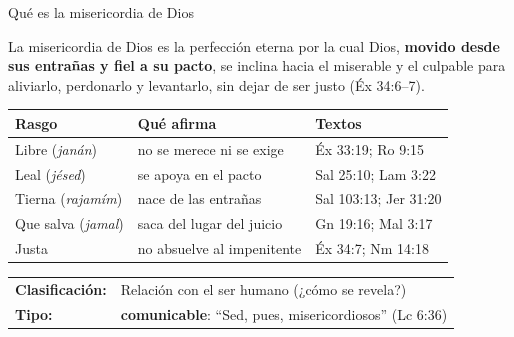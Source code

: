 \documentclass[hyperref={bookmarks=false},aspectratio=169]{beamer}
\newcommand{\destacar}[1]{\textbf{\textcolor{azul}{#1}}}
\begin{document}
\begin{frame}{Qué es la misericordia de Dios}
\begin{tcolorbox}[colback=papiro,colframe=azul,boxrule=1pt,arc=3pt,fonttitle=\bfseries\small,title=Definición]
\small La misericordia de Dios es la perfección eterna por la cual Dios, \destacar{movido desde sus entrañas y fiel a su pacto}, se inclina hacia el miserable y el culpable para aliviarlo, perdonarlo y levantarlo, sin dejar de ser justo (Éx 34:6--7).
\end{tcolorbox}
\scriptsize\renewcommand{\arraystretch}{1.2}
\begin{tabular}{@{}>{\RaggedRight\arraybackslash}p{2.4cm}>{\RaggedRight\arraybackslash}p{5.6cm}>{\RaggedRight\arraybackslash}p{3.6cm}@{}}
\toprule
\textbf{Rasgo} & \textbf{Qué afirma} & \textbf{Textos} \\ \midrule
Libre (\emph{janán}) & no se merece ni se exige & Éx 33:19; Ro 9:15 \\
Leal (\emph{jésed}) & se apoya en el pacto & Sal 25:10; Lam 3:22 \\
Tierna (\emph{rajamím}) & nace de las entrañas & Sal 103:13; Jer 31:20 \\
Que salva (\emph{jamal}) & saca del lugar del juicio & Gn 19:16; Mal 3:17 \\
Justa & no absuelve al impenitente & Éx 34:7; Nm 14:18 \\
\bottomrule
\end{tabular}\par\smallskip
\begin{center}\footnotesize
\begin{tabular}{ll}
\textbf{Clasificación:} & Relación con el ser humano (¿cómo se revela?)\\
\textbf{Tipo:} & \destacar{comunicable}: ``Sed, pues, misericordiosos'' (Lc 6:36)\\
\end{tabular}
\end{center}
\end{frame}
\end{document}
